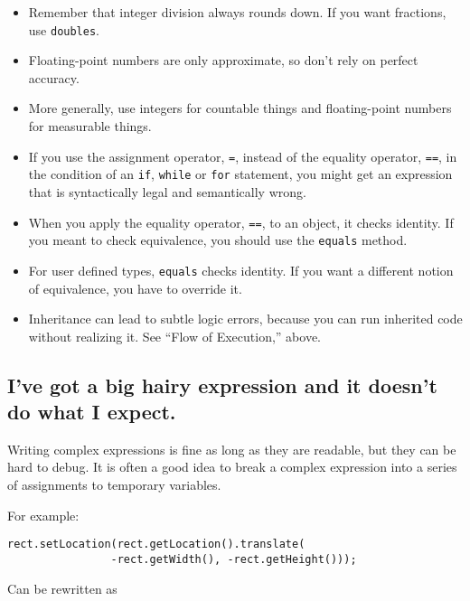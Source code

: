 \documentclass[12pt]{book}
\theoremstyle{definition}
\begin{document}
\begin{itemize}

\item Remember that integer division always rounds down.  If you
want fractions, use {\tt doubles}.

\item Floating-point numbers are only approximate, so don't rely
on perfect accuracy.

\item More generally, use integers for countable things
and floating-point numbers for measurable things.

\item If you use the assignment operator,
{\tt =}, instead of the equality operator, {\tt ==}, in the
condition of an {\tt if}, {\tt while} or {\tt for} statement,
you might get an expression that is syntactically legal and
semantically wrong.

\item When you apply the equality operator, {\tt ==}, to an
object, it checks identity.  If you meant to check
equivalence, you should use the {\tt equals} method.

\item For user defined types, {\tt equals} checks identity.
If you want a different notion of equivalence, you have to
override it.

\item Inheritance can lead to subtle logic errors,
because you can run inherited code without realizing it.
See ``Flow of Execution,'' above.

\end{itemize}


\subsection*{I've got a big hairy expression and it doesn't
do what I expect.}

Writing complex expressions is fine as long as they are readable,
but they can be hard to debug.  It is often a good idea to
break a complex expression into a series of assignments to
temporary variables.

For example:

\begin{lstlisting}
rect.setLocation(rect.getLocation().translate(
                -rect.getWidth(), -rect.getHeight()));
\end{lstlisting}
%
Can be rewritten as
\end{document}
